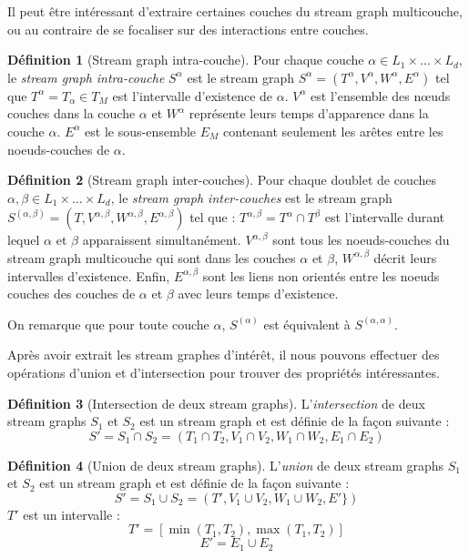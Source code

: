 \documentclass[11pt,a4paper]{article}
\theoremstyle{definition}
\newtheorem{defn}{Définition}
\theoremstyle{remark}
\theoremstyle{remark}
\def \stgm {stream graph multicouche}
\begin{document}
	Il peut être intéressant d'extraire certaines couches du \stgm{}, ou au contraire de se focaliser sur des interactions entre couches.
	 
	\begin{defn}[Stream graph intra-couche]
	Pour chaque couche $\alpha \in L_1 \times \dots \times L_d$, le {\em stream graph intra-couche} $S^{\alpha}$ est le stream graph $S^{\alpha}=(T^{\alpha},V^{\alpha},W^{\alpha},E^{\alpha})$ tel que $T^{\alpha} = T_{\alpha} \in T_M$ est l'intervalle d'existence de $\alpha$. $V^{\alpha}$ est l'ensemble des nœuds couches dans la couche $\alpha$ et $W^{\alpha}$ représente leurs temps d'apparence dans la couche $\alpha$. $E^{\alpha}$ est le sous-ensemble $E_M$ contenant seulement les arêtes entre les noeuds-couches de $\alpha$.
	\end{defn}
	
	
	\begin{defn}[Stream graph inter-couches]	
	Pour chaque doublet de couches $\alpha, \beta \in L_1\times \dots\times L_d$, le {\em stream graph inter-couches} est le stream graph $S^{(\alpha,\beta)} = (T, V^{\alpha,\beta},W^{\alpha,\beta},E^{\alpha,\beta})$ tel que : $T^{\alpha,\beta}=T^{\alpha}\cap T^{\beta}$ est l'intervalle durant lequel $\alpha$ et $\beta$ apparaissent simultanément. $V^{\alpha,\beta}$ sont tous les noeuds-couches du stream graph multicouche qui sont dans les couches $\alpha$ et $\beta$, $W^{\alpha,\beta}$ décrit leurs intervalles d'existence. Enfin, $E^{\alpha,\beta}$ sont les liens non orientés entre les noeuds couches des couches de $\alpha$ et $\beta$ avec leurs temps d'existence.
	\end{defn}
	

	On remarque que pour toute couche $\alpha$, $S^{(\alpha)}$ est équivalent à $S^{(\alpha,\alpha)}$.


	Après avoir extrait les stream graphes d'intérêt, il nous pouvons effectuer des opérations d'union et d'intersection pour trouver des propriétés intéressantes.
	
	\begin{defn}[Intersection de deux stream graphs]
	L'{\em intersection} de deux stream graphs $S_1$ et $S_2$ est un stream graph et est définie de la façon suivante :
	\[
		S' = S_1 \cap S_2 = (T_1\cap T_2, V_1 \cap V_2, W_1 \cap W_2, E_1\cap E_2)
	\]
	\end{defn}
	

	\begin{defn}[Union de deux stream graphs]
	L'{\em union} de deux stream graphs $S_1$ et $S_2$ est un stream graph et est définie de la façon suivante :
	\[
		S' = S_1 \cup S_2 = (T', V_1 \cup V_2, W_1 \cup W_2, E' \})
	\]
	$T'$ est un intervalle :
	\[
		T' = [\min(T_1,T_2),\max(T_1,T_2)]
	\]
	\[
		E' = E_1 \cup E_2 
	\]
	
	\end{defn}
	
\end{document}
